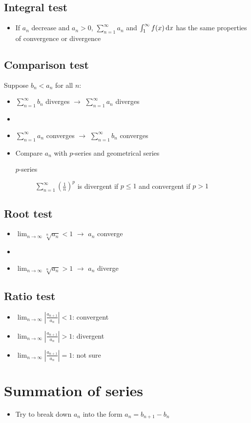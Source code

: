 \subsection{Integral test}
\begin{itemize}
    \item If $a_n$ decrease and $a_n>0$, $\sum_{n=1}^{\infty}a_n$ and $\int_{1}^{\infty} f(x) \operatorname{\mathrm{d}\mathit{x}}$
          has the same properties of convergence or divergence
\end{itemize}

\subsection{Comparison test}
Suppose $b_n<a_n$ for all $n$:
\begin{itemize}
    \item $\sum_{n=1}^{\infty}b_n$ diverges $\rightarrow$ $\sum_{n=1}^{\infty}a_n$ diverges
    \item \item $\sum_{n=1}^{\infty}a_n$ converges $\rightarrow$ $\sum_{n=1}^{\infty}b_n$ converges
    \item Compare $a_n$ with $p$-series and geometrical series
          \begin{description}
              \item[$p$-series] $\sum_{n=1}^{\infty} \left(\frac{1}{n}\right)^p$ is divergent if $p\leq 1$ and
                    convergent if $p>1$
          \end{description}
\end{itemize}

\subsection{Root test}
\begin{itemize}
    \item $\lim_{n\rightarrow\infty}\sqrt[n]{a_n} < 1$ $\rightarrow$ $a_n$ converge
    \item \item $\lim_{n\rightarrow\infty}\sqrt[n]{a_n} > 1$ $\rightarrow$ $a_n$ diverge
\end{itemize}

\subsection{Ratio test}
\begin{itemize}
    \item $\lim_{n\rightarrow\infty} \left|\frac{a_{n+1}}{a_n}\right| < 1$: convergent
    \item $\lim_{n\rightarrow\infty} \left|\frac{a_{n+1}}{a_n}\right| > 1$: divergent
    \item $\lim_{n\rightarrow\infty} \left|\frac{a_{n+1}}{a_n}\right| = 1$: not sure
\end{itemize}

\section{Summation of series}
\begin{itemize}
    \item Try to break down $a_n$ into the form $a_n=b_{n+1}-b_n$
\end{itemize}